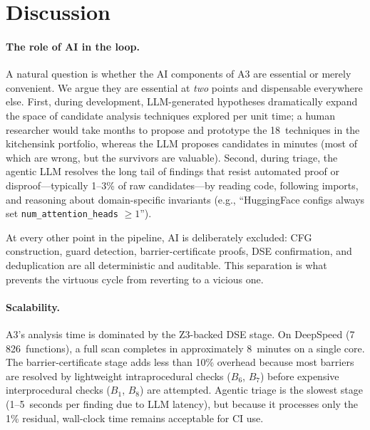 \documentclass[sigconf,review,anonymous]{acmart}
\begin{document}
\section{Discussion}\label{sec:discussion}

\paragraph{The role of AI in the loop.}
A natural question is whether the AI components of \textsc{A3} are essential or merely convenient.  We argue they are essential at \emph{two} points and dispensable everywhere else.  First, during development, LLM-generated hypotheses dramatically expand the space of candidate analysis techniques explored per unit time; a human researcher would take months to propose and prototype the 18~techniques in the kitchensink portfolio, whereas the LLM proposes candidates in minutes (most of which are wrong, but the survivors are valuable).  Second, during triage, the agentic LLM resolves the long tail of findings that resist automated proof or disproof---typically 1--3\% of raw candidates---by reading code, following imports, and reasoning about domain-specific invariants (e.g., ``HuggingFace configs always set \texttt{num\_attention\_heads} $\geq 1$'').

At every other point in the pipeline, AI is deliberately excluded: CFG construction, guard detection, barrier-certificate proofs, DSE confirmation, and deduplication are all deterministic and auditable.  This separation is what prevents the virtuous cycle from reverting to a vicious one.

\paragraph{Scalability.}
\textsc{A3}'s analysis time is dominated by the Z3-backed DSE stage.  On DeepSpeed (7\,826~functions), a full scan completes in approximately 8~minutes on a single core.  The barrier-certificate stage adds less than 10\% overhead because most barriers are resolved by lightweight intraprocedural checks ($B_6$, $B_7$) before expensive interprocedural checks ($B_1$, $B_8$) are attempted.  Agentic triage is the slowest stage (1--5~seconds per finding due to LLM latency), but because it processes only the 1\% residual, wall-clock time remains acceptable for CI use.
\end{document}
